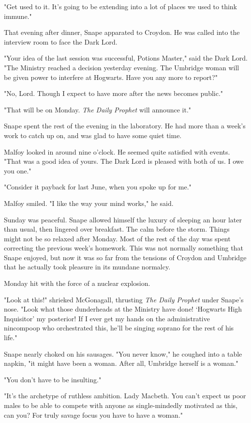 \documentclass[a4paper,11pt]{article}
\begin{document}
"Get used to it. It's going to be extending into a lot of places we used to think immune."

That evening after dinner, Snape apparated to Croydon. He was called into the interview room to face the Dark Lord.

"Your idea of the last session was successful, Potions Master," said the Dark Lord. "The Ministry reached a decision yesterday evening. The Umbridge woman will be given power to interfere at Hogwarts. Have you any more to report?"

"No, Lord. Though I expect to have more after the news becomes public."

"That will be on Monday. \emph{The Daily Prophet} will announce it."

Snape spent the rest of the evening in the laboratory. He had more than a week's work to catch up on, and was glad to have some quiet time.

Malfoy looked in around nine o'clock. He seemed quite satisfied with events. "That was a good idea of yours. The Dark Lord is pleased with both of us. I owe you one."

"Consider it payback for last June, when you spoke up for me."

Malfoy smiled. "I like the way your mind works," he said.

Sunday was peaceful. Snape allowed himself the luxury of sleeping an hour later than usual, then lingered over breakfast. The calm before the storm. Things might not be so relaxed after Monday. Most of the rest of the day was spent correcting the previous week's homework. This was not normally something that Snape enjoyed, but now it was so far from the tensions of Croydon and Umbridge that he actually took pleasure in its mundane normalcy.

Monday hit with the force of a nuclear explosion.

"Look at this!" shrieked McGonagall, thrusting \emph{The Daily Prophet} under Snape's nose. "Look what those dunderheads at the Ministry have done! `Hogwarts High Inquisitor' my posterior! If I ever get my hands on the administrative nincompoop who orchestrated this, he'll be singing soprano for the rest of his life."

Snape nearly choked on his sausages. "You never know," he coughed into a table napkin, "it might have been a woman. After all, Umbridge herself is a woman."

"You don't have to be insulting."

"It's the archetype of ruthless ambition. Lady Macbeth. You can't expect us poor males to be able to compete with anyone as single-mindedly motivated as this, can you? For truly savage focus you have to have a woman."
\end{document}
